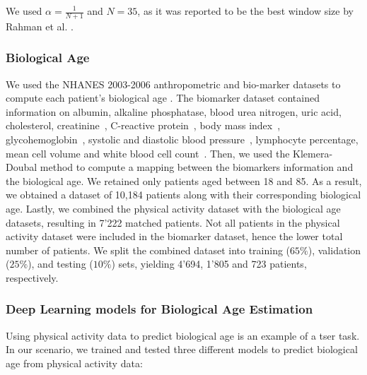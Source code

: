 We used $\alpha = \frac{1}{N+1}$ and $N=35$, as it was reported to be the best window size by Rahman et al. \cite{rahman_deep_2019}.

\subsubsection{Biological Age}
We used the NHANES 2003-2006 anthropometric and bio-marker datasets to compute each patient's biological age \cite{kwon_toolkit_2021}. The biomarker dataset contained information on albumin, alkaline phosphatase, blood urea nitrogen, uric acid, cholesterol, creatinine~\cite{cdc_biopro_d_2005}, C-reactive protein~\cite{cdc_crp_d_2005}, body mass index~\cite{cdc_bmx_c_2003}, glycohemoglobin~\cite{cdc_l10_c_2003}, systolic and diastolic blood pressure~\cite{cdc_bpq_c_2003}, lymphocyte percentage, mean cell volume and white blood cell count~\cite{cdc_l25_c_2003}.
% 
% 
% 
% 
% 
Then, we used the Klemera-Doubal method \cite{klemera_new_2006} to compute a mapping between the biomarkers information and the biological age. We retained only patients aged between 18 and 85. As a result, we obtained a dataset of 10,184 patients along with their corresponding biological age.
Lastly, we combined the physical activity dataset with the biological age datasets, resulting in 7'222 matched patients. Not all patients in the physical activity dataset were included in the biomarker dataset, hence the lower total number of patients. We split the combined dataset into training ($65\%$), validation ($25\%$), and testing ($10\%$) sets, yielding 4'694, 1'805 and 723 patients, respectively.
\subsubsection{Deep Learning models for Biological Age Estimation}
Using physical activity data to predict biological age is an example of a \gls{tser} task. In our scenario, we trained and tested three different models to predict biological age from physical activity data: 

